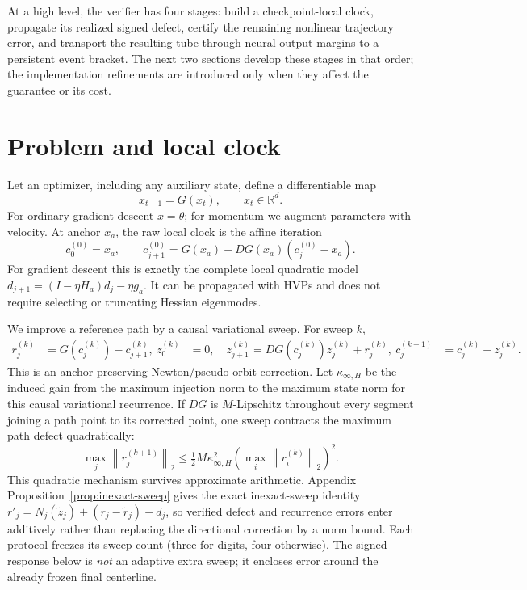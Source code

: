 \documentclass{article}
\newcommand{\R}{\mathbb{R}}
\newcommand{\norm}[1]{\left\lVert #1\right\rVert_2}
\begin{document}
At a high level, the verifier has four stages: build a checkpoint-local clock,
propagate its realized signed defect, certify the remaining nonlinear
trajectory error, and transport the resulting tube through neural-output
margins to a persistent event bracket.  The next two sections develop these
stages in that order; the implementation refinements are introduced only when
they affect the guarantee or its cost.

\section{Problem and local clock}
\label{sec:problem}

Let an optimizer, including any auxiliary state, define a differentiable map
\begin{equation}
  x_{t+1}=G(x_t),\qquad x_t\in\R^d.
  \label{eq:map}
\end{equation}
For ordinary gradient descent $x=\theta$; for momentum we augment parameters
with velocity.  At anchor $x_a$, the raw local clock is the affine iteration
\begin{equation}
  c^{(0)}_0=x_a,\qquad
  c^{(0)}_{j+1}=G(x_a)+DG(x_a)(c^{(0)}_j-x_a).
  \label{eq:affineclock}
\end{equation}
For gradient descent this is exactly the complete local quadratic model
$d_{j+1}=(I-\eta H_a)d_j-\eta g_a$.  It can be propagated with HVPs and does
not require selecting or truncating Hessian eigenmodes.

We improve a reference path by a causal variational sweep.  For sweep $k$,
\begin{align}
 r^{(k)}_j&=G(c^{(k)}_j)-c^{(k)}_{j+1},\
 z^{(k)}_0&=0,\quad
 z^{(k)}_{j+1}=DG(c^{(k)}_j)z^{(k)}_j+r^{(k)}_j,\
 c^{(k+1)}_j&=c^{(k)}_j+z^{(k)}_j.
 \label{eq:sweep}
\end{align}
This is an anchor-preserving Newton/pseudo-orbit correction.  Let
$\kappa_{\infty,H}$ be the induced gain from the maximum injection norm to the
maximum state norm for this causal variational recurrence.  If $DG$ is
$M$-Lipschitz throughout every segment joining a path point to its corrected
point, one sweep contracts the maximum path defect quadratically:
\begin{equation}
 \max_j\norm{r^{(k+1)}_j}
  \le \tfrac12M\kappa_{\infty,H}^2
  \left(\max_i\norm{r^{(k)}_i}\right)^2.
  \label{eq:defectcontraction}
\end{equation}
This quadratic mechanism survives approximate arithmetic.  Appendix
Proposition~\ref{prop:inexact-sweep} gives the exact inexact-sweep identity
$r'_j=N_j(\widetilde z_j)+(r_j-\widetilde r_j)-d_j$, so verified defect and
recurrence errors enter additively rather than replacing the directional
correction by a norm bound.
Each protocol freezes its sweep count (three for digits, four otherwise).
The signed response below is \emph{not} an adaptive extra sweep; it encloses
error around the already frozen final centerline.
\end{document}
